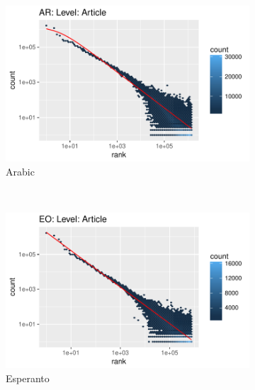 \documentclass{article}
\begin{document}
\begin{figure}
	\centering
	\begin{subfigure}[b]{0.3\textwidth}
		\includegraphics[trim={0 0 2.2cm 0.6cm},clip, width=\textwidth]{AR_Article_mle.pdf}
		\caption{Arabic}
		\label{fig:ar_mle}
	\end{subfigure}
	~ %
	\begin{subfigure}[b]{0.3\textwidth}
		\includegraphics[trim={0 0 2.2cm 0.6cm},clip, width=\textwidth]{EO_Article_mle.pdf}
		\caption{Esperanto}
		\label{fig:eo_mle}
	\end{subfigure}
	~ %
	\begin{subfigure}[b]{0.3\textwidth}

\end{subfigure}
\end{figure}
\end{document}
